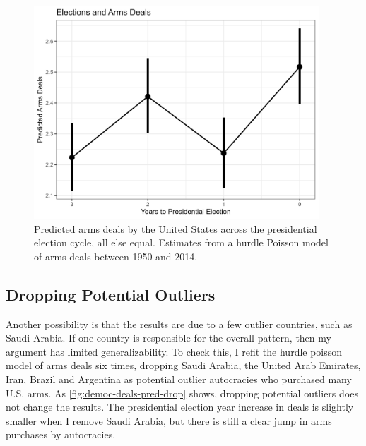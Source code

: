 \documentclass[12pt]{article}
\begin{document}
\begin{figure}[htpb]
	\centering
		\includegraphics[width=0.95\textwidth]{elec-pred-deals.png}
	\caption{Predicted arms deals by the United States across the presidential election cycle, all else equal. Estimates from a hurdle Poisson model of arms deals between 1950 and 2014. }
	\label{fig:elec-pred-deals}
\end{figure}



\subsection{Dropping Potential Outliers}

Another possibility is that the results are due to a few outlier countries, such as Saudi Arabia. 
If one country is responsible for the overall pattern, then my argument has limited generalizability. 
To check this, I refit the hurdle poisson model of arms deals six times, dropping Saudi Arabia, the United Arab Emirates, Iran, Brazil and Argentina as potential outlier autocracies who purchased many U.S. arms. 
As \autoref{fig:democ-deals-pred-drop} shows, dropping potential outliers does not change the results. 
The presidential election year increase in deals is slightly smaller when I remove Saudi Arabia, but there is still a clear jump in arms purchases by autocracies.  
\end{document}
